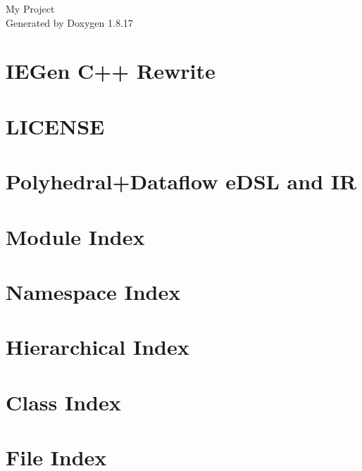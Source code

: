 \let\mypdfximage\pdfximage\def\pdfximage{\immediate\mypdfximage}\documentclass[twoside]{book}
\newcommand{\+}{\discretionary{\mbox{\scriptsize$\hookleftarrow$}}{}{}}
\newcommand{\clearemptydoublepage}{%
  \newpage{\pagestyle{empty}\cleardoublepage}%
}
\begin{document}
\hypersetup{pageanchor=false,
             bookmarksnumbered=true,
             pdfencoding=unicode
            }
\begin{titlepage}
\vspace*{7cm}
\begin{center}%
{\Large My Project }\\
\vspace*{1cm}
{\large Generated by Doxygen 1.8.17}\\
\end{center}
\end{titlepage}
\clearemptydoublepage
{}
\tableofcontents
\clearemptydoublepage
{}
\hypersetup{pageanchor=true}

\chapter{I\+E\+Gen C++ Rewrite}
\label{index}\hypertarget{index}{}
\chapter{L\+I\+C\+E\+N\+SE}
\label{md__l_i_c_e_n_s_e}

\chapter{Polyhedral+\+Dataflow e\+D\+SL and IR}
\label{md__r_e_a_d_m_e}

\chapter{Module Index}

\chapter{Namespace Index}

\chapter{Hierarchical Index}

\chapter{Class Index}

\chapter{File Index}

\end{document}
